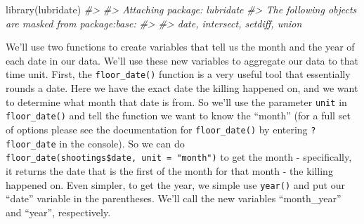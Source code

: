 \documentclass[
]{krantz}
\makeatletter
\newenvironment{Shaded}{\begin{snugshade}}{\end{snugshade}}
\newcommand{\AttributeTok}[1]{\textcolor[rgb]{0.61,0.61,0.61}{#1}}
\newcommand{\CommentTok}[1]{\textcolor[rgb]{0.37,0.37,0.37}{\textit{#1}}}
\newcommand{\FunctionTok}[1]{\textcolor[rgb]{0,0,0}{#1}}
\newcommand{\NormalTok}[1]{#1}
\newcommand{\OtherTok}[1]{\textcolor[rgb]{0.37,0.37,0.37}{#1}}
\newcommand{\SpecialCharTok}[1]{\textcolor[rgb]{0,0,0}{#1}}
\newcommand{\StringTok}[1]{\textcolor[rgb]{0.5,0.5,0.5}{#1}}
\newenvironment{kframe}{%
\medskip{}
\setlength{\fboxsep}{.8em}
 \def\at@end@of@kframe{}%
 \ifinner\ifhmode%
  \def\at@end@of@kframe{\end{minipage}}%
  \begin{minipage}{\columnwidth}%
 \fi\fi%
 \def\FrameCommand##1{\hskip\@totalleftmargin \hskip-\fboxsep
 \colorbox{shadecolor}{##1}\hskip-\fboxsep
     \hskip-\linewidth \hskip-\@totalleftmargin \hskip\columnwidth}%
 \MakeFramed {\advance\hsize-\width
   \@totalleftmargin\z@ \linewidth\hsize
   \@setminipage}}%
 {\par\unskip\endMakeFramed%
 \at@end@of@kframe}
\renewenvironment{Shaded}{\begin{kframe}}{\end{kframe}}
\makeatother
\begin{document}
\begin{Shaded}
\begin{Highlighting}[]
\FunctionTok{library}\NormalTok{(lubridate)}
\CommentTok{\#\textgreater{} }
\CommentTok{\#\textgreater{} Attaching package: \textquotesingle{}lubridate\textquotesingle{}}
\CommentTok{\#\textgreater{} The following objects are masked from \textquotesingle{}package:base\textquotesingle{}:}
\CommentTok{\#\textgreater{} }
\CommentTok{\#\textgreater{}     date, intersect, setdiff, union}
\end{Highlighting}
\end{Shaded}

We'll use two functions to create variables that tell us the month and the year of each date in our data. We'll use these new variables to aggregate our data to that time unit. First, the \texttt{floor\_date()} function is a very useful tool that essentially rounds a date. Here we have the exact date the killing happened on, and we want to determine what month that date is from. So we'll use the parameter \texttt{unit} in \texttt{floor\_date()} and tell the function we want to know the ``month'' (for a full set of options please see the documentation for \texttt{floor\_date()} by entering \texttt{?floor\_date} in the console). So we can do \texttt{floor\_date(shootings\$date,\ unit\ =\ "month")} to get the month - specifically, it returns the date that is the first of the month for that month - the killing happened on. Even simpler, to get the year, we simple use \texttt{year()} and put our ``date'' variable in the parentheses. We'll call the new variables ``month\_year'' and ``year'', respectively.

\begin{Shaded}
\end{Shaded}
\end{document}
